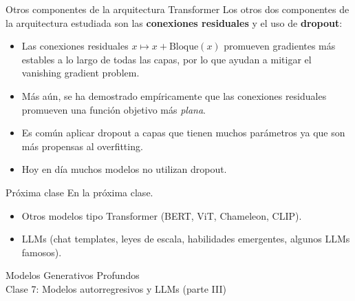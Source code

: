 \documentclass{beamer}
\begin{document}
\begin{frame}{Otros componentes de la arquitectura Transformer}
    Los otros dos componentes de la arquitectura estudiada son las \textbf{conexiones residuales} y el uso de \textbf{dropout}:
    \begin{itemize}
        \item Las conexiones residuales $x\mapsto x+\text{Bloque}(x)$ promueven gradientes más estables a lo largo de todas las capas, por lo que ayudan a mitigar el vanishing gradient problem.
        \item Más aún, se ha demostrado empíricamente que las conexiones residuales promueven una función objetivo más \textit{plana}.
        \item Es común aplicar dropout a capas que tienen muchos parámetros ya que son más propensas al overfitting.
        \item Hoy en día muchos modelos no utilizan dropout.
    \end{itemize}
    

    
\end{frame}

\begin{frame}{Próxima clase}
    En la próxima clase.
    \begin{itemize}
        \item Otros modelos tipo Transformer (BERT, ViT, Chameleon, CLIP).
        \item LLMs (chat templates, leyes de escala, habilidades emergentes, algunos LLMs famosos).
    \end{itemize}
\end{frame}

\begin{frame}
    \centering
    \Large{Modelos Generativos Profundos}\\
    \large{Clase 7: Modelos autorregresivos y LLMs (parte III)}
\end{frame}
\end{document}
